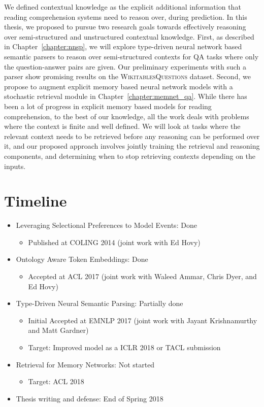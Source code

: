 We defined contextual knowledge as the explicit additional information that reading comprehension systems need to reason over, during prediction. In this thesis, we proposed to pursue two research goals towards effectively reasoning over semi-structured and unstructured contextual knowledge.
First, as described in Chapter~\ref{chapter:nnsp}, we will explore type-driven neural network based semantic parsers to reason over semi-structured contexts for QA tasks where only the question-answer pairs are given. Our preliminary experiments with such a parser show promising
results on the \textsc{WikitablesQuestions} dataset. Second, we propose to augment explicit memory based neural network models with a stochastic retrieval module in Chapter~\ref{chapter:memnet_qa}. While there has been a lot of progress in explicit memory based models for reading comprehension, to the best of our knowledge, all the
work deals with problems where the context is finite and well defined. We will look at tasks where the relevant context needs to be retrieved before any reasoning can be performed over it, and our proposed approach involves jointly training the retrieval and reasoning components, and determining
when to stop retrieving contexts depending on the inputs.

\section{Timeline}
\begin{itemize}
    \item Leveraging Selectional Preferences to Model Events: Done
    \begin{itemize}
     \item Published at COLING 2014 (joint work with Ed Hovy)
    \end{itemize}

    \item Ontology Aware Token Embeddings: Done
    \begin{itemize}
        \item Accepted at ACL 2017 (joint work with Waleed Ammar, Chris Dyer, and Ed Hovy)
    \end{itemize}
    
    \item Type-Driven Neural Semantic Parsing: Partially done
    \begin{itemize}
     \item Initial Accepted at EMNLP 2017 (joint work with Jayant Krishnamurthy and Matt Gardner)
     \item Target: Improved model as a ICLR 2018 or TACL submission
    \end{itemize}

    \item Retrieval for Memory Networks: Not started
    \begin{itemize}
     \item Target: ACL 2018
    \end{itemize}
    
    \item Thesis writing and defense: End of Spring 2018
\end{itemize}
